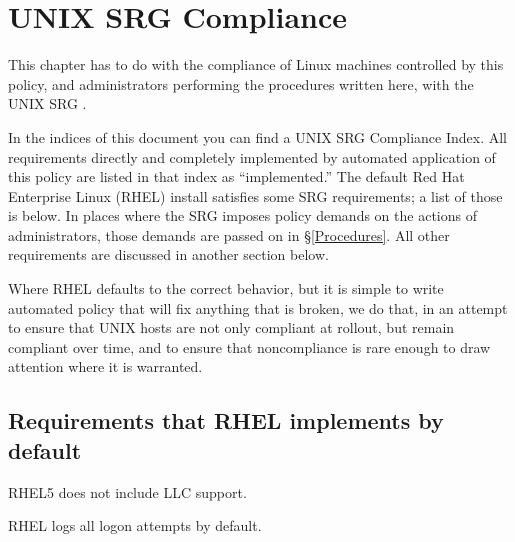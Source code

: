 
\chapter{UNIX SRG Compliance}
\label{UNIXSRGCompliance}

This chapter has to do with the compliance of Linux machines controlled by
this policy, and administrators performing the procedures written here,
with the UNIX SRG \cite{unix-srg}.

In the indices of this document you can find a UNIX SRG Compliance Index.
All requirements directly and completely implemented by automated
application of this policy are listed in that index as ``implemented.''
The default Red Hat Enterprise Linux (RHEL) install satisfies some SRG
requirements; a list of those is below. In places where the SRG imposes
policy demands on the actions of administrators, those demands are passed
on in \S\ref{Procedures}. All other requirements are discussed in another
section below.

Where RHEL defaults to the correct behavior, but it is simple to write
automated policy that will fix anything that is broken, we do that, in an
attempt to ensure that UNIX hosts are not only compliant at rollout, but
remain compliant over time, and to ensure that noncompliance is rare
enough to draw attention where it is warranted.






\section{Requirements that RHEL implements by default}

 RHEL5 does not include LLC
support.

 RHEL logs all logon attempts by default.

